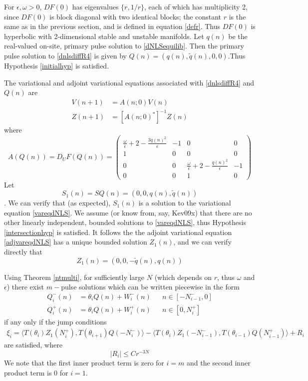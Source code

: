 \documentclass[12pt]{article}
\begin{document}
For $\epsilon, \omega > 0$, $DF(0)$ has eigenvalues $\{r, 1/r\}$, each of which has multiplicity 2, since $DF(0)$ is block diagonal with two identical blocks; the constant $r$ is the same as in the previous section, and is defined in equation \eqref{defr}. Thus $DF(0)$ is hyperbolic with 2-dimensional stable and unstable manifolds. Let $q(n)$ be the real-valued on-site, primary pulse solution to \eqref{dNLSequilib}. Then the primary pulse solution to \eqref{dnlsdiffR4} is given by $Q(n) = (q(n), \tilde{q}(n), 0, 0)$.Thus Hypothesis \ref{initialhyp} is satisfied.

The variational and adjoint variational equations associated with \eqref{dnlsdiffR4} and $Q(n)$ are
\begin{align}
V(n+1) &= A(n; 0) V(n) \label{vareqdNLS} \\
Z(n+1) &= [A(n; 0)^*]^{-1} Z(n) \label{adjvareqdNLS}
\end{align}
where
\begin{equation}\label{AQdNLS}
A(Q(n)) = D_U F(Q(n)) = 
\begin{pmatrix}
\frac{\omega}{\epsilon} + 2 - \frac{3 q(n)^2}{\epsilon} & -1 & 0 & 0 \\
1 & 0 & 0 & 0 \\
0 & 0 & \frac{\omega}{\epsilon} + 2 - \frac{q(n)^2}{\epsilon} & -1 \\
0 & 0 & 1 & 0
\end{pmatrix}
\end{equation}
Let 
\begin{equation}\label{defS1}
S_1(n) = S Q(n) = (0, 0, q(n), \tilde{q}(n))
\end{equation}. 
We can verify that (as expected), $S_1(n)$ is a solution to the variational equation \eqref{vareqdNLS}. We assume (or know from, say, Kev09x) that there are no other linearly independent, bounded solutions to \eqref{vareqdNLS}, thus Hypothesis \ref{intersectionhyp} is satisfied. It follows the the adjoint variational equation \eqref{adjvareqdNLS} has a unique bounded solution $Z_1(n)$, and we can verify directly that
\begin{equation}\label{defZ1}
Z_1(n) = (0, 0, -\tilde{q}(n), q(n))
\end{equation}

Using Theorem \ref{ntmulti}, for sufficiently large $N$ (which depends on $r$, thus $\omega$ and $\epsilon$) there exist $m-$pulse solutions which can be written piecewise in the form  
\begin{align*}
Q_i^-(n) &= \theta_i Q(n) + W_i^-(n) && n \in [-N_{i-1}^-, 0] \\
Q_i^+(n) &= \theta_i Q(n) + W_i^+(n) && n \in [0, N_i^+]
\end{align*}
if any only if the jump conditions
\begin{align*}
\xi_i = \langle T(\theta_i) Z_1(N_i^+), T(\theta_{i+1}) Q(-N_i^-) \rangle
- \langle T(\theta_i) Z_1(-N_{i-1}^-), T(\theta_{i-1}) Q(N_{i-1}^+) \rangle + R_i
\end{align*}
are satisfied, where
\[
|R_i| \leq C r^{-3N}
\]
We note that the first inner product term is zero for $i = m$ and the second inner product term is 0 for $i = 1$.
\end{document}
